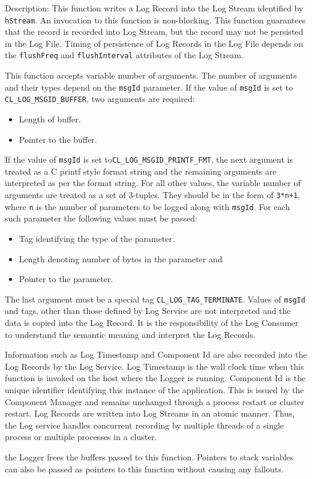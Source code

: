 \begin{flushleft}
\begin{Desc}
\begin{description}
\end{description}
\end{Desc}
\begin{Desc}
\item[Description:] This function writes a Log Record into the Log Stream identified by {\tt{hStream}}. An invocation to this function is non-blocking. This 
function guarantees that the record is recorded into Log Stream, but the record may not be persisted in the Log File. Timing of 
persistence of Log Records in the Log File depends on the {\tt{flushFreq}} and {\tt{flushInterval}} attributes of the Log Stream.
\par

This function accepts variable number of arguments. The number of arguments and their types depend on the {\tt{msgId}} parameter. If the value
of {\tt{msgId}} is set to {\tt{CL\_\-LOG\_\-MSGID\_\-BUFFER}}, two arguments are required:
\begin{itemize}
\item
Length of buffer.
\item
Pointer to the buffer.
\end{itemize}
If the value of {\tt{msgId}} is set to{\tt{CL\_\-LOG\_\-MSGID\_\-PRINTF\_\-FMT}}, the next argument is treated as a C printf style format string and the
remaining arguments are interpreted as per the format string. For all other values, the variable number of arguments are treated as a set of 3-tuples. 
They should be in the form of {\tt{3*n+1}}, where {\tt{n}} is the number of parameters to be logged along with {\tt{msgId}}. For each such parameter the 
following values must be passed:
\begin{itemize}
\item
Tag identifying the type of the parameter.
\item
Length denoting number of bytes in the parameter and 
\item
Pointer to the parameter. 
\end{itemize}
The last argument must be a special tag {\tt{CL\_\-LOG\_\-TAG\_\-TERMINATE}}. Values of {\tt{msgId}} and tags, 
other than those defined by Log Service are not interpreted and the data is copied into the Log Record. It is the responsibility of the Log Consumer 
to understand the semantic meaning and interpret the Log Records.
\par
Information such as Log Timestamp and Component Id are also recorded into the Log Records by the Log Service. Log Timestamp is the wall clock 
time when this function is invoked on the host where the Logger is running. Component Id is the unique identifier identifying this 
instance of the application. This is issued by the Component Manager and remains unchanged through a process restart or cluster restart.
Log Records are written into Log Streams in an atomic manner. Thus, the Log service handles concurrent recording by multiple threads of a single process 
or multiple processes in a cluster.
\par
the Logger frees the buffers passed to this function.
Pointers to stack variables can also be passed as pointers to this function without causing any fallouts.


\end{Desc}
\end{flushleft}
